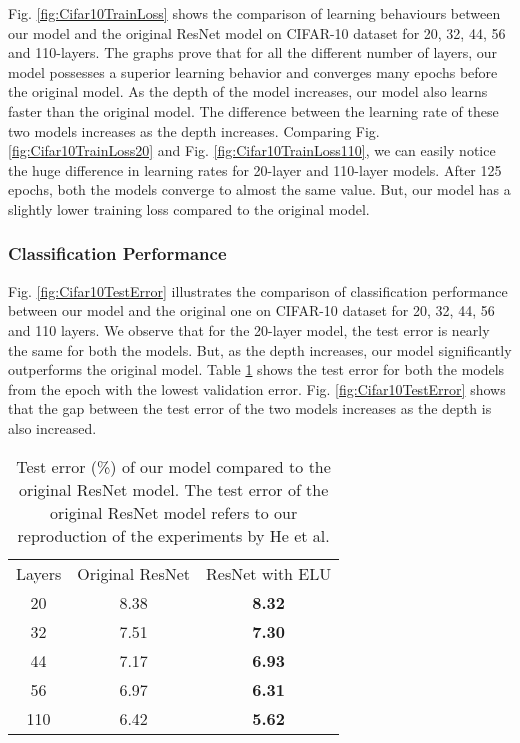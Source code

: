 \documentclass[10pt,twocolumn,letterpaper]{article}
\begin{document}
Fig. \ref{fig:Cifar10TrainLoss} shows the comparison of learning behaviours between our model and the original ResNet model on CIFAR-10 dataset for 20, 32, 44, 56 and 110-layers. The graphs prove that for all the different number of layers, our model possesses a superior learning behavior and converges many epochs before the original model. As the depth of the model increases, our model also learns faster than the original model. The difference between the learning rate of these two models increases as the depth increases. Comparing Fig. \ref{fig:Cifar10TrainLoss20} and Fig. \ref{fig:Cifar10TrainLoss110}, we can easily notice the huge difference in learning rates for 20-layer and 110-layer models. After 125 epochs, both the models converge to almost the same value. But, our model has a slightly lower training loss compared to the original model.

\subsubsection{Classification Performance}

Fig. \ref{fig:Cifar10TestError} illustrates the comparison of classification performance between our model and the original one on CIFAR-10 dataset for 20, 32, 44, 56 and 110 layers. We observe that for the 20-layer model, the test error is nearly the same for both the models. But, as the depth increases, our model significantly outperforms the original model. Table \ref{table:Cifar10TestErrorTable} shows the test error for both the models from the epoch with the lowest validation error. Fig. \ref{fig:Cifar10TestError} shows that the gap between the test error of the two models increases as the depth is also increased.

\setlength{\tabcolsep}{4pt}
\begin{table}
    \centering
    \caption{Test error (\%) of our model compared to the original ResNet model. The test error of the original ResNet model refers to our reproduction of the experiments by  He et al. \cite{[1]}}
    \label{table:Cifar10TestErrorTable}
    \begin{tabular}{c c c}
        \hline \noalign{\smallskip}
        Layers & Original ResNet & ResNet with ELU \\
        \noalign{\smallskip}
        \hline
        \noalign{\smallskip}
        20 & 8.38 & \textbf{8.32}\\
        32 & 7.51 & \textbf{7.30}\\
        44 & 7.17 & \textbf{6.93}\\
        56 & 6.97 & \textbf{6.31}\\
        110 & 6.42 & \textbf{5.62}\\
        \hline
    \end{tabular}
\end{table}
\end{document}

